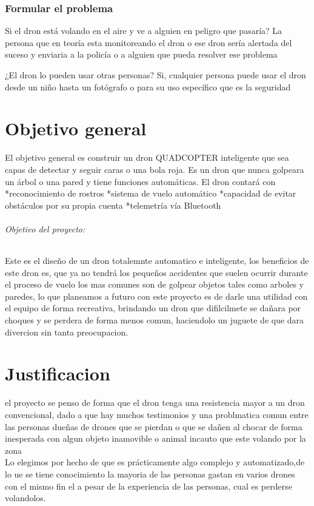 \documentclass[11pt,a4paper]{article}
\begin{document}
\section{Formular el problema}
Si el dron está volando en el aire y ve a alguien en peligro que pasaría?
La persona que en teoría esta monitoreando el dron o ese dron sería alertada del suceso y enviaria a la policía o a alguien que pueda resolver ese problema

¿El dron lo pueden usar otras personas?
Si, cualquier persona puede usar el dron desde un niño hasta un fotógrafo o para su uso específico que es la seguridad

\part{Objetivo general}
El objetivo general es construir un dron QUADCOPTER inteligente
que sea capas de detectar y seguir caras o
una bola roja.
Es un dron que nunca golpeara un árbol o
una pared y tiene funciones automáticas.
El dron contará con
*reconocimiento de rostros
*sistema de vuelo automático
*capacidad de evitar obstáculos por su
propia cuenta
*telemetría vía Bluetooth

\paragraph{Objetivo del proyecto:}


Este es el diseño de un dron totalemnte automatico e inteligente, los beneficios de este dron es, que ya no tendrá los pequeños accidentes que suelen ocurrir durante el proceso de vuelo los mas comunes son de golpear objetos tales como arboles y paredes, lo que planeamos a futuro con este proyecto es de darle una utilidad con el equipo de forma recreativa, brindando un dron que difilcilmete se dañara por choques y se perdera de forma menos comun, haciendolo un juguete de que dara divercion sin tanta preocupacion.


\part{Justificacion}

el proyecto se penso de forma que el dron tenga una resistencia mayor a un dron convencional, dado a que hay muchos testimonios y una problmatica comun entre las personas dueñas de drones que se pierdan o que se dañen al chocar de forma inesperada con algun objeto inamovible o animal incauto que este volando por la zona   \\
Lo elegimos por hecho de que es prácticamente algo complejo y automatizado,de lo 	ue se tiene conocimiento la mayoria de las personas gastan en varios drones con el mismo fin el a pesar de la experiencia de las personas, cual es perderse volandolos. 
\end{document}
